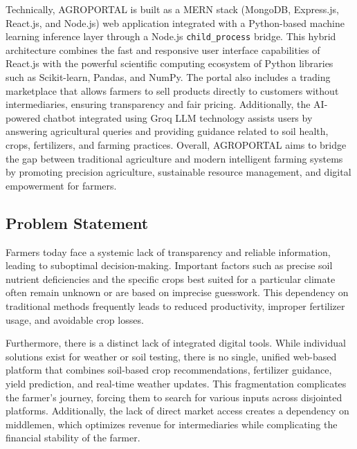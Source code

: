 Technically, AGROPORTAL is built as a MERN stack (MongoDB, Express.js, React.js, and Node.js) web application integrated with a Python-based machine learning inference layer through a Node.js \texttt{child\_process} bridge. This hybrid architecture combines the fast and responsive user interface capabilities of React.js with the powerful scientific computing ecosystem of Python libraries such as Scikit-learn, Pandas, and NumPy. The portal also includes a trading marketplace that allows farmers to sell products directly to customers without intermediaries, ensuring transparency and fair pricing. Additionally, the AI-powered chatbot integrated using Groq LLM technology assists users by answering agricultural queries and providing guidance related to soil health, crops, fertilizers, and farming practices. Overall, AGROPORTAL aims to bridge the gap between traditional agriculture and modern intelligent farming systems by promoting precision agriculture, sustainable resource management, and digital empowerment for farmers.

\subsection{Problem Statement}

Farmers today face a systemic lack of transparency and reliable information, leading to suboptimal decision-making. Important factors such as precise soil nutrient deficiencies and the specific crops best suited for a particular climate often remain unknown or are based on imprecise guesswork. This dependency on traditional methods frequently leads to reduced productivity, improper fertilizer usage, and avoidable crop losses.

Furthermore, there is a distinct lack of integrated digital tools. While individual solutions exist for weather or soil testing, there is no single, unified web-based platform that combines soil-based crop recommendations, fertilizer guidance, yield prediction, and real-time weather updates. This fragmentation complicates the farmer's journey, forcing them to search for various inputs across disjointed platforms. Additionally, the lack of direct market access creates a dependency on middlemen, which optimizes revenue for intermediaries while complicating the financial stability of the farmer.

